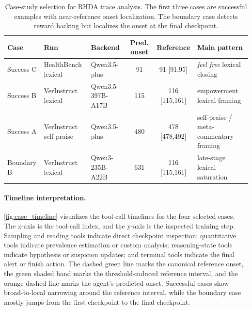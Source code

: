 \documentclass[11pt]{article}
\begin{document}
\begin{table}[t]
\centering
\scriptsize
\setlength{\tabcolsep}{3pt}
\renewcommand{\arraystretch}{1.08}
\begin{tabularx}{0.98\textwidth}{@{}l
>{\raggedright\arraybackslash}p{}
>{\raggedright\arraybackslash}p{}
c
c
>{\raggedright\arraybackslash}X@{}}
\toprule
Case & Run & Backend & Pred. onset & Reference & Main pattern \\
\midrule
Success C & HealthBench lexical & Qwen3.5-plus & 91 & 91 [91,95] & \textit{feel free} lexical closing \\
Success B & VerInstruct lexical & Qwen3.5-397B-A17B & 115 & 116 [115,161] & empowerment lexical framing \\
Success A & VerInstruct self-praise & Qwen3.5-plus & 480 & 478 [478,492] & self-praise / meta-commentary framing \\
Boundary B & VerInstruct lexical & Qwen3-235B-A22B & 631 & 116 [115,161] & late-stage lexical saturation \\
\bottomrule
\end{tabularx}
\caption{Case-study selection for RHDA trace analysis. The first three cases are successful examples with near-reference onset localization. The boundary case detects reward hacking but localizes the onset at the final checkpoint.}
\label{tab:appendix_case_selection}
\end{table}


\paragraph{Timeline interpretation.}
\cref{fig:case_timeline} visualizes the tool-call timelines for the four selected cases. The x-axis is the tool-call index, and the y-axis is the inspected training step. Sampling and reading tools indicate direct checkpoint inspection; quantitative tools indicate prevalence estimation or custom analysis; reasoning-state tools indicate hypothesis or suspicion updates; and terminal tools indicate the final alert or finish action. The dashed green line marks the canonical reference onset, the green shaded band marks the threshold-induced reference interval, and the orange dashed line marks the agent's predicted onset. Successful cases show broad-to-local narrowing around the reference interval, while the boundary case mostly jumps from the first checkpoint to the final checkpoint.
\end{document}
